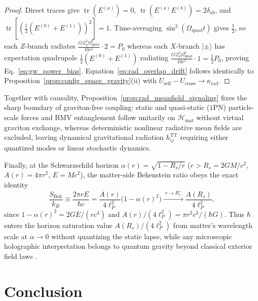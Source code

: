 \documentclass[aps,prd,onecolumn,tightenlines,nofootinbib,notitlepage,10pt,floatfix]{revtex4-2}
\theoremstyle{indentedtheorem}
\begin{document}
\begin{proof}
Direct traces give $\operatorname{tr}(E^{(a)})=0$, $\operatorname{tr}(E^{(a)}E^{(b)})=2\delta_{ab}$, and $\operatorname{tr}[(\tfrac{1}{2}(E^{(0)}+E^{(1)}))^2]=1$. Time-averaging $\sin^2(\Omega_\text{quad}t)$ gives $\tfrac{1}{2}$, so each $Z$-branch radiates $\frac{G\mathcal{Q}_0^2\Omega_\text{quad}^6}{10c^5}\cdot 2=P_0$ whereas each $X$-branch $|\pm\rangle$ has expectation quadrupole $\tfrac{1}{2}(E^{(0)}+E^{(1)})$ radiating $\frac{G\mathcal{Q}_0^2\Omega_\text{quad}^6}{10c^5}\cdot 1=\tfrac{1}{2}P_0$, proving Eq.~\eqref{eq:gw_power_bias}. Equation~\eqref{eq:rad_overlap_drift} follows identically to Proposition~\ref{prop:config_space_gravity}(ii) with $U_\text{self}-U_\text{cross}\to\kappa_\text{rad}$.
\end{proof}

\noindent Together with causality, Proposition~\ref{prop:rad_meanfield_signaling} fixes the sharp boundary of graviton-free coupling: static and quasi-static ($1$PN) particle-scale forces and BMV entanglement follow unitarily on $\mathcal{H}_\text{mat}$ without virtual graviton exchange, whereas deterministic nonlinear radiative mean fields are excluded, leaving dynamical gravitational radiation $h_{ij}^\text{TT}$ requiring either quantized modes or linear stochastic dynamics.

Finally, at the Schwarzschild horizon $\alpha(r)=\sqrt{1-R_s/r}$ ($r>R_s=2GM/c^2$, $A(r)=4\pi r^2$, $E=Mc^2$), the matter-side Bekenstein ratio obeys the exact identity
\begin{equation}
    \frac{S_\text{Bek}}{k_B} \equiv \frac{2\pi r E}{\hbar c} = \frac{A(r)}{4\ell_P^2}\big(1-\alpha(r)^2\big) \xrightarrow{\;r\to R_s^+\;} \frac{A(R_s)}{4\ell_P^2} ,
    \label{eq:bek_bh_sat}
\end{equation}
since $1-\alpha(r)^2=2GE/(rc^4)$ and $A(r)/(4\ell_P^2)=\pi r^2 c^3/(\hbar G)$. Thus $\hbar$ enters the horizon saturation value $A(R_s)/(4\ell_P^2)$ from matter's wavelength scale at $\alpha\to 0$ without quantizing the static lapse, while any microscopic holographic interpretation belongs to quantum gravity beyond classical exterior field laws \citep{Bousso2002,Marolf2009}.

\section{Conclusion}
\label{sec:conclusion}
\end{document}
